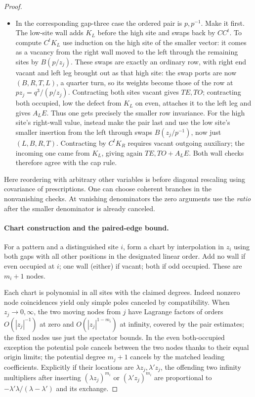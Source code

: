 \documentclass[11pt]{article}
\numberwithin{equation}{section}
\theoremstyle{definition}\newtheorem{definition}[theorem]{Definition}
\theoremstyle{remark}\newtheorem{remark}[theorem]{Remark}
\begin{document}
\begin{proof}
\begin{itemize}
\item In the corresponding gap-three case the ordered pair is \(p,p^{-1}\). Make it first. The low-site wall adds \(K_L\) before the high site and swaps back by \(CC^t\). To compute \(C^t K_L\) use induction on the high site of the smaller vector: it comes as a vacancy from the right wall moved to the left through the remaining sites by \(B(p/z_j)\). These swaps are exactly an ordinary row, with right end vacant and left leg brought out as that high site: the swap ports are now \((B,R,T,L)\), a quarter turn, so its weights become those of the row at \(p z_j=q^3/(p/z_j)\). Contracting both sites vacant gives \(T E,T O\); contracting both occupied, low the defect from \(K_L\) on even, attaches it to the left leg and gives \(A_L E\). Thus one gets precisely the smaller row invariance. For the high site's right-wall value, instead make the pair last and use the low site's smaller insertion from the left through swaps \(B(z_j/p^{-1})\), now just \((L,B,R,T)\). Contracting by \(C^t K_R\) requires vacant outgoing auxiliary; the incoming one came from \(K_L\), giving again \(T E,T O+A_L E\). Both wall checks therefore agree with the cap rule.
\end{itemize}
Here reordering with arbitrary other variables is before diagonal rescaling using covariance of prescriptions. One can choose coherent branches in the nonvanishing checks. At vanishing denominators the zero arguments use the \emph{ratio} after the smaller denominator is already canceled.

\paragraph{Chart construction and the paired-edge bound.}
For a pattern and a distinguished site \(i\), form a chart by interpolation in \(z_i\) using both gaps with all other positions in the designated linear order. Add no wall if even occupied at \(i\); one wall (either) if vacant; both if odd occupied. These are \(m_i+1\) nodes. 

Each chart is polynomial in all sites with the claimed degrees. Indeed nonzero node coincidences yield only simple poles canceled by compatibility. When \(z_j\to0,\infty\), the two moving nodes from \(j\) have Lagrange factors of orders \(O(|z_j|^{-1})\) at zero and \(O(|z_j|^{1-m_i})\) at infinity, covered by the pair estimates; the fixed nodes use just the spectator bounds. In the even both-occupied exception the potential pole cancels between the two nodes thanks to their equal origin limits; the potential degree \(m_j+1\) cancels by the matched leading coefficients. Explicitly if their locations are \(\lambda z_j,\lambda' z_j\), the offending two infinity multipliers after inserting \((\lambda z_j)^{m_i}\) or \((\lambda'z_j)^{m_i}\) are proportional to \(-\lambda'\lambda/(\lambda-\lambda')\) and its exchange.


\end{proof}
\end{document}
